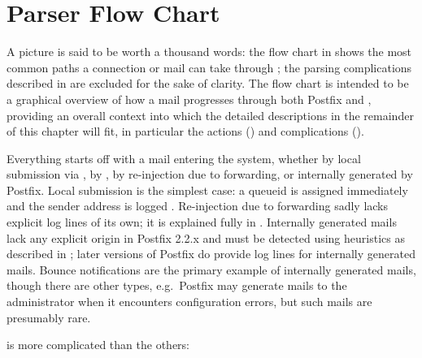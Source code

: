 \section{Parser Flow Chart}

\label{flow chart}

A picture is said to be worth a thousand words: the flow chart in
 shows the most common paths a connection or
mail can take through \parsername{}; the parsing complications described in
 are excluded for the sake of clarity.  The flow
chart is intended to be a graphical overview of how a mail progresses
through both Postfix and \parsername{}, providing an overall context into
which the detailed descriptions in the remainder of this chapter will fit,
in particular the actions () and
complications ().


Everything starts off with a mail entering the system, whether by local
submission via , by , by re-injection due to
forwarding, or internally generated by Postfix.  Local submission is the
simplest case: a queueid is assigned immediately and the sender address is
logged .  Re-injection due to forwarding sadly lacks
explicit log lines of its own; it is explained fully in
.  Internally generated mails lack any
explicit origin in Postfix 2.2.x and must be detected using heuristics as
described in ; later versions
of Postfix do provide log lines for internally generated mails.  Bounce
notifications are the primary example of internally generated mails, though
there are other types, e.g.\ Postfix may generate mails to the
administrator when it encounters configuration errors, but such mails are
presumably rare.

 is more complicated than the others:


